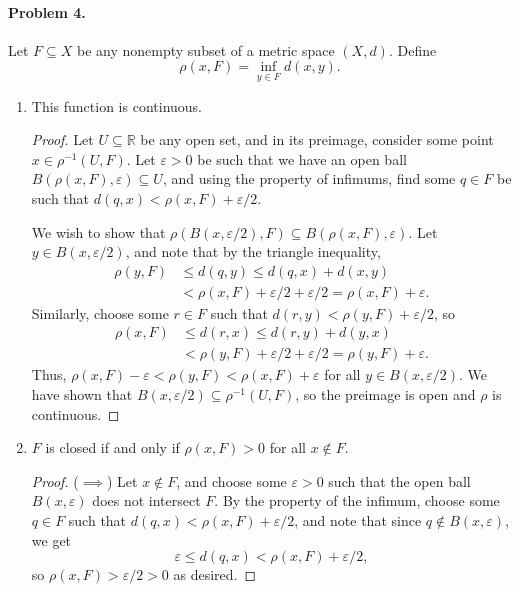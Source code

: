 \documentclass[12pt]{article}
\begin{document}
\paragraph{Problem 4.}
Let $F \subseteq X$ be any nonempty subset of a metric space $(X, d)$. Define \[\rho(x, F) = \inf_{y\in F} d(x, y).\]
\begin{enumerate}
\item This function is continuous.
\begin{proof}
    Let $U \subseteq \mathbb R$ be any open set, and in its preimage, consider some point $x \in \rho^{-1}(U, F)$. Let $\varepsilon > 0$ be such that we have an open ball $B(\rho(x, F), \varepsilon) \subseteq U$, and using the property of infimums, find some $q \in F$ be such that $d(q, x) < \rho(x, F) + \varepsilon / 2$. 
    
    We wish to show that $\rho(B(x, \varepsilon / 2), F) \subseteq B(\rho(x, F), \varepsilon)$. Let $y \in B(x, \varepsilon / 2)$, and note that by the triangle inequality, \begin{align*} \rho(y, F) &\le d(q, y) \le d(q, x) + d(x, y) \\ &< \rho(x, F) + \varepsilon / 2 + \varepsilon / 2 = \rho(x, F) + \varepsilon.
     \end{align*}
    Similarly, choose some $r \in F$ such that $d(r, y) < \rho(y, F) + \varepsilon / 2$, so
    \begin{align*} 
        \rho(x, F) &\le d(r, x) \le d(r, y) + d(y, x) \\ &< \rho(y, F) + \varepsilon / 2 + \varepsilon / 2 = \rho(y, F) + \varepsilon.
    \end{align*}
    Thus, $\rho(x, F) - \varepsilon < \rho(y, F) < \rho(x, F) + \varepsilon$ for all $y \in B(x, \varepsilon / 2)$. We have shown that $B(x, \varepsilon / 2) \subseteq \rho^{-1}(U, F)$, so the preimage is open and $\rho$ is continuous.
\end{proof}

\item $F$ is closed if and only if $\rho(x, F) > 0$ for all $x \not\in F$. 
\begin{proof}
    ($\implies$) Let $x \not\in F$, and choose some $\varepsilon > 0$ such that the open ball $B(x, \varepsilon)$ does not intersect $F$. By the property of the infimum, choose some $q \in F$ such that $d(q, x) < \rho(x, F) + \varepsilon / 2$, and note that since $q \not\in B(x, \varepsilon)$, we get
    \[\varepsilon \le d(q, x) < \rho(x, F) + \varepsilon / 2, \]
    so $\rho(x, F) > \varepsilon / 2 > 0$ as desired.


\end{proof}
\end{enumerate}
\end{document}
